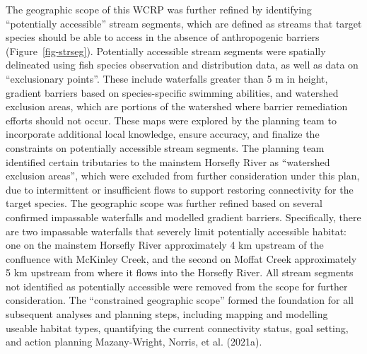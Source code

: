 \documentclass[
  letterpaper,
  DIV=11,
  numbers=noendperiod]{scrreprt}
\begin{document}
The geographic scope of this WCRP was further refined by identifying
``potentially accessible'' stream segments, which are defined as streams
that target species should be able to access in the absence of
anthropogenic barriers (Figure~\ref{fig-strseg}). Potentially accessible
stream segments were spatially delineated using fish species observation
and distribution data, as well as data on ``exclusionary points''. These
include waterfalls greater than 5 m in height, gradient barriers based
on species-specific swimming abilities, and watershed exclusion areas,
which are portions of the watershed where barrier remediation efforts
should not occur. These maps were explored by the planning team to
incorporate additional local knowledge, ensure accuracy, and finalize
the constraints on potentially accessible stream segments. The planning
team identified certain tributaries to the mainstem Horsefly River as
``watershed exclusion areas'', which were excluded from further
consideration under this plan, due to intermittent or insufficient flows
to support restoring connectivity for the target species. The geographic
scope was further refined based on several confirmed impassable
waterfalls and modelled gradient barriers. Specifically, there are two
impassable waterfalls that severely limit potentially accessible
habitat: one on the mainstem Horsefly River approximately 4 km upstream
of the confluence with McKinley Creek, and the second on Moffat Creek
approximately 5 km upstream from where it flows into the Horsefly River.
All stream segments not identified as potentially accessible were
removed from the scope for further consideration. The ``constrained
geographic scope'' formed the foundation for all subsequent analyses and
planning steps, including mapping and modelling useable habitat types,
quantifying the current connectivity status, goal setting, and action
planning Mazany-Wright, Norris, et al. (2021a).
\end{document}

